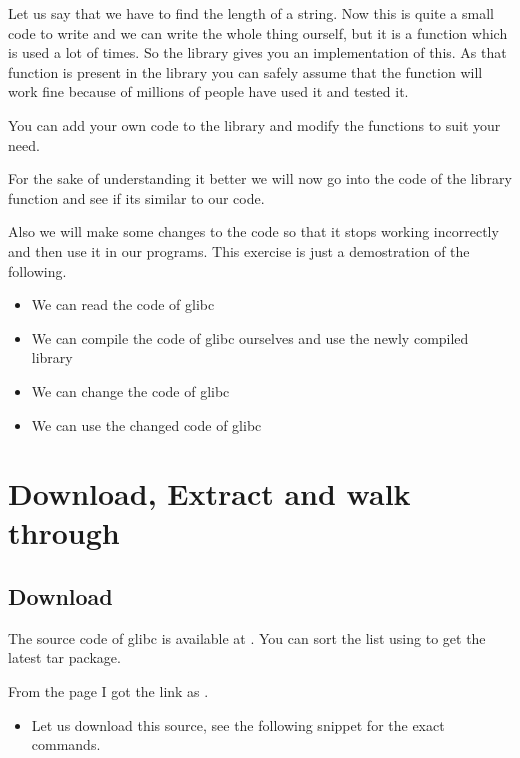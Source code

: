 \documentclass[letterpaper,10pt,english]{sphinxmanual}
\begin{document}
 Let us say that we have to find the length of a string. Now this
is quite a small code to write and we can write the whole thing ourself, but it
is a function which is used a lot of times. So the library gives you an
implementation of this. As that function is present in the library you can
safely assume that the function will work fine because of millions of people
have used it and tested it.

You can add your own code to the library and modify the functions to suit your need.

For the sake of understanding it better we will now go into the code of the
library function and see if its similar to our code.

Also we will make some changes to the code so that it stops working incorrectly
and then use it in our programs. This exercise is just a demostration of the
following.
\begin{itemize}
\item {} 
We can read the code of glibc

\item {} 
We can compile the code of glibc ourselves and use the newly compiled library

\item {} 
We can change the code of glibc

\item {} 
We can use the changed code of glibc

\end{itemize}


\section{Download, Extract and walk through }
\label{\detokenize{03_glibc:download-extract-and-walk-through-glibc}}

\subsection{Download}
\label{\detokenize{03_glibc:download}}
The source code of glibc is available at . You
can sort the list using  to get the latest tar package.

From the page I got the link as .
\begin{itemize}
\item {} 
Let us download this source, see the following snippet for the exact commands.

\end{itemize}
\end{document}
